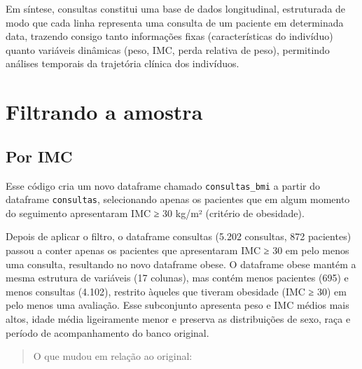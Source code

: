\documentclass[
]{article}
\begin{document}
Em síntese, consultas constitui uma base de dados longitudinal,
estruturada de modo que cada linha representa uma consulta de um
paciente em determinada data, trazendo consigo tanto informações fixas
(características do indivíduo) quanto variáveis dinâmicas (peso, IMC,
perda relativa de peso), permitindo análises temporais da trajetória
clínica dos indivíduos.

\section{Filtrando a amostra}\label{filtrando-a-amostra}

\subsection{Por IMC}\label{por-imc}

Esse código cria um novo dataframe chamado \texttt{consultas\_bmi} a
partir do dataframe \texttt{consultas}, selecionando apenas os pacientes
que em algum momento do seguimento apresentaram IMC ≥ 30 kg/m² (critério
de obesidade).

Depois de aplicar o filtro, o dataframe consultas (5.202 consultas, 872
pacientes) passou a conter apenas os pacientes que apresentaram IMC ≥ 30
em pelo menos uma consulta, resultando no novo dataframe obese. O
dataframe obese mantém a mesma estrutura de variáveis (17 colunas), mas
contém menos pacientes (695) e menos consultas (4.102), restrito àqueles
que tiveram obesidade (IMC ≥ 30) em pelo menos uma avaliação. Esse
subconjunto apresenta peso e IMC médios mais altos, idade média
ligeiramente menor e preserva as distribuições de sexo, raça e período
de acompanhamento do banco original.

\begin{quote}
O que mudou em relação ao original:
\end{quote}
\end{document}
